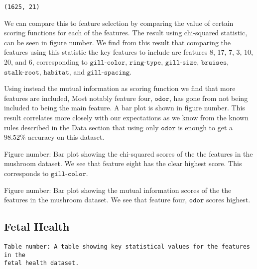 \documentclass[11pt]{article}
\makeatletter
\newcommand{\boxspacing}{\kern\kvtcb@left@rule\kern\kvtcb@boxsep}
\newcommand{\prompt}[4]{
        {\ttfamily\llap{{\color{#2}[#3]:\hspace{3pt}#4}}\vspace{-\baselineskip}}
    }
\makeatother
\begin{document}
            \begin{tcolorbox}[breakable, size=fbox, boxrule=.5pt, pad at break*=1mm, opacityfill=0]
\prompt{Out}{outcolor}{113}{\boxspacing}
\begin{Verbatim}[commandchars=\\\{\}]
(1625, 21)
\end{Verbatim}
\end{tcolorbox}
        
    We can compare this to feature selection by comparing the value of
certain scoring functions for each of the features. The result using
chi-squared statistic, can be seen in figure number. We find from this
result that comparing the features using this statistic the key features
to include are features 8, 17, 7, 3, 10, 20, and 6, corresponding to
\(\texttt{gill-color}\), \(\texttt{ring-type}\), \(\texttt{gill-size}\),
\(\texttt{bruises}\), \(\texttt{stalk-root}\), \(\texttt{habitat}\), and
\(\texttt{gill-spacing}\).

Using instead the mutual information as scoring function we find that
more features are included, Most notably feature four,
\(\texttt{odor}\), has gone from not being included to being the main
feature. A bar plot is shown in figure number. This result correlates
more closely with our expectations as we know from the known rules
described in the Data section that using only \(\texttt{odor}\) is
enough to get a \(98.52\%\) accuracy on this dataset.

    Figure number: Bar plot showing the chi-squared scores of the the
features in the mushroom dataset. We see that feature eight has the
clear highest score. This corresponds to \(\texttt{gill-color}\).

    Figure number: Bar plot showing the mutual information scores of the the
features in the mushroom dataset. We see that feature four,
\(\texttt{odor}\) scores highest.

    \hypertarget{fetal-health}{%
\subsection{Fetal Health}\label{fetal-health}}


    \begin{Verbatim}[commandchars=\\\{\}]
Table number: A table showing key statistical values for the features in the
fetal health dataset.
    \end{Verbatim}
\end{document}
